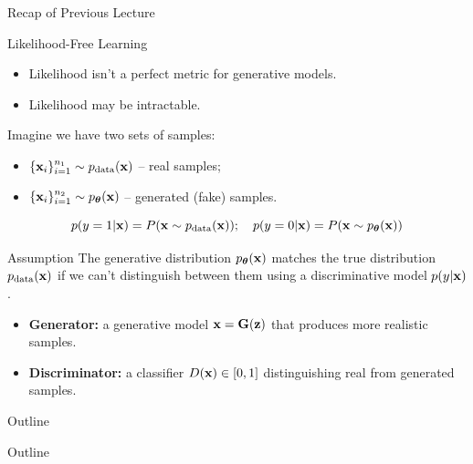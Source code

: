 \documentclass{beamer}
\begin{document}
\begin{frame}{Recap of Previous Lecture}
	\begin{block}{Likelihood-Free Learning}
		\begin{itemize}
			\item Likelihood isn't a perfect metric for generative models.
			\item Likelihood may be intractable.
		\end{itemize}
	\end{block}
	Imagine we have two sets of samples:
	\begin{itemize}
		\item $\{\mathbf{x}_i\}_{i=1}^{n_1} \sim p_{\text{data}}(\mathbf{x})$ -- real samples;
		\item $\{\mathbf{x}_i\}_{i=1}^{n_2} \sim p_{\boldsymbol{\theta}}(\mathbf{x})$ -- generated (fake) samples.
	\end{itemize}
	\[
		p(y = 1 | \mathbf{x}) = P(\mathbf{x} \sim p_{\text{data}}(\mathbf{x})); \quad p(y = 0 | \mathbf{x}) = P(\mathbf{x} \sim p_{\boldsymbol{\theta}}(\mathbf{x}))
	\]
	\vspace{-0.5cm}
	\begin{block}{Assumption}
		The generative distribution $p_{\boldsymbol{\theta}}(\mathbf{x})$ matches the true distribution $p_{\text{data}}(\mathbf{x})$ if we can't distinguish between them using a discriminative model $p(y|\mathbf{x})$.
	\end{block}
	\begin{itemize}
		\item \textbf{Generator:} a generative model $\mathbf{x} = \mathbf{G}(\mathbf{z})$ that produces more realistic samples.
		\item \textbf{Discriminator:} a classifier $D(\mathbf{x}) \in [0, 1]$ distinguishing real from generated samples.
	\end{itemize}
\end{frame}
\begin{frame}{Outline}
	\tableofcontents
\end{frame}
\begin{frame}{Outline}
	\tableofcontents
\end{frame}
\end{document}
